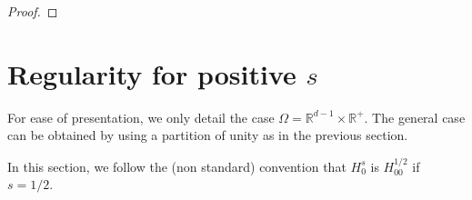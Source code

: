 \documentclass[AHL,Unicode,longabstracts,published]{cedram}
\newcommand{\R}{\mathbb{R}}
\begin{document}
\begin{proof}
%

\end{proof}

\section{Regularity for positive $s$}\label{sect5}
For ease of presentation, we only detail the case $\Omega =\R^{d-1}\times \R^+$. The general case can be obtained by using a partition of unity as in the previous section. 


In this section, we follow the (non standard) convention that $H^s_0$ is $H^{1/2}_{00}$ if $s=1/2$.
\end{document}

